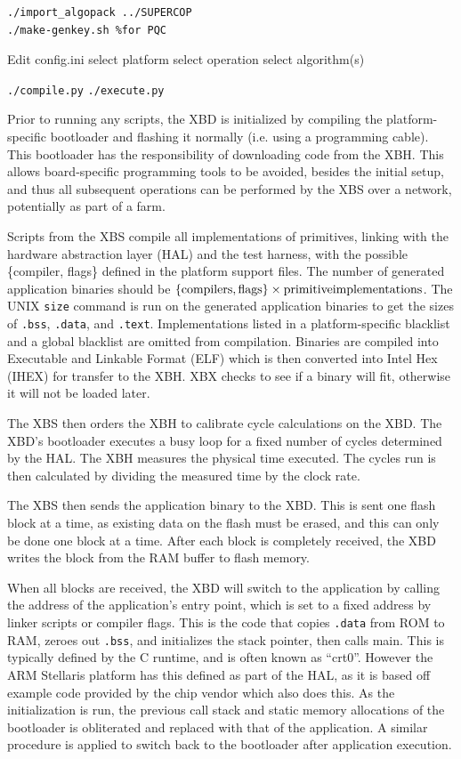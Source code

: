 \documentclass[twoside,11pt]{cergdoc}
\begin{document}
\begin{lstlisting}
./import_algopack ../SUPERCOP
./make-genkey.sh %for PQC
\end{lstlisting}
Edit config.ini
select platform
select operation
select algorithm(s)

\verb|./compile.py|
\verb|./execute.py|

Prior to running any scripts, the XBD is initialized by compiling the
platform-specific bootloader and flashing it normally (i.e. using a programming
cable). 
This bootloader has the responsibility of downloading code from the XBH. This allows board-specific
programming tools to be avoided, besides the initial setup, and thus all
subsequent operations can be performed by the XBS over a network, potentially as
part of a farm.

Scripts from the XBS compile all implementations of primitives, linking with
the hardware abstraction layer (HAL) and the test harness, with the possible
\{compiler, flags\} defined in the platform support files. The number of generated
application binaries should be $\{\rm{compilers,flags}\}\times\rm{primitive
implementations}$. The UNIX \texttt{size} command is run on the generated
application binaries to get the sizes of
\texttt{.bss}, \texttt{.data}, and \texttt{.text}. Implementations listed in a
platform-specific blacklist and a global blacklist are omitted from compilation.
Binaries are compiled into Executable and Linkable Format (ELF) which is then
converted into Intel Hex (IHEX) for transfer to the XBH. XBX checks to see if
a binary will fit, otherwise it will not be loaded later.

The XBS then orders the XBH to calibrate cycle calculations on the XBD. The
XBD's bootloader executes a busy loop for a fixed number of cycles determined by
the HAL. The XBH measures the physical time executed. The cycles run is then
calculated by dividing the measured time by the clock rate.

The XBS then sends the application binary to the XBD. This is sent one flash
block at a time, as existing data on the flash must be erased, and this can only
be done one block at a time. After each block is completely received, the XBD
writes the block from the RAM buffer to flash
memory. 

When all blocks are received, the XBD will switch to the application by
calling the address of the application's entry point, which is set to a fixed
address by linker scripts or compiler flags. This is the code
that copies \texttt{.data} from ROM to RAM, zeroes out \texttt{.bss}, and
initializes the stack pointer, then calls main. This is typically defined by the
C runtime, and is often known as ``crt0''. However the ARM Stellaris platform has
this defined as part of the HAL, as it is based off example code provided by the
chip vendor which also does this. As the initialization is run, the previous
call stack and static memory allocations of the bootloader is obliterated and
replaced with that of the application. A similar procedure is applied to switch
back to the bootloader after application execution. 
\end{document}
